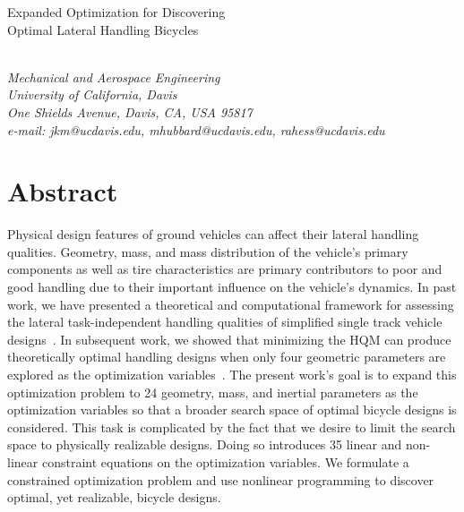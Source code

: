 \documentclass{bmd2019a}
\begin{document}
\begin{flushleft}
{\fontsize{16pt}{20pt}\selectfont%
  Expanded Optimization for Discovering\\}
{\fontsize{16pt}{20pt}\selectfont%
  Optimal Lateral Handling Bicycles}
\end{flushleft}

\begin{flushleft}
  {\\}
  \textit{Mechanical and Aerospace Engineering\\
          University of California, Davis\\
          One Shields Avenue, Davis, CA, USA 95817\\
          e-mail: jkm@ucdavis.edu, mhubbard@ucdavis.edu, rahess@ucdavis.edu}
\end{flushleft}

\section*{Abstract}
%
Physical design features of ground vehicles can affect their lateral handling
qualities. Geometry, mass, and mass distribution of the vehicle's primary
components as well as tire characteristics are primary contributors to poor and good
handling due to their important influence on the vehicle's dynamics. In past
work, we have presented a theoretical and computational framework for assessing
the lateral task-independent handling qualities of simplified single track
vehicle designs~\cite{Hess2012,Moore2012}. In subsequent work, we showed
that minimizing the HQM can produce theoretically optimal handling designs when
only four geometric parameters are explored as the optimization
variables~\cite{Moore2016}. The present work's goal is to expand this
optimization problem to 24 geometry, mass, and inertial parameters as the
optimization variables so that a broader search space of optimal bicycle
designs is considered. This task is complicated by the fact that we desire to
limit the search space to physically realizable designs. Doing so
introduces 35 linear and non-linear constraint equations on the optimization
variables. We formulate a constrained optimization problem and use nonlinear
programming to discover optimal, yet realizable, bicycle designs.
\end{document}
